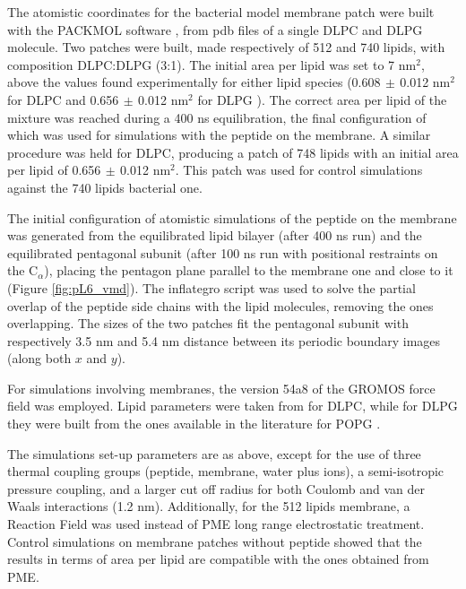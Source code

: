 The atomistic coordinates for the bacterial model membrane patch were built with the PACKMOL software \cite{Martinez2009}, from pdb files of a single DLPC \cite{PogerOrig} and DLPG \cite{Kukol2009} molecule. Two patches were built, made respectively of 512 and 740 lipids, with composition DLPC:DLPG (3:1). The initial area per lipid was set to 7 nm$^2$, above the values found experimentally for either lipid species (0.608$\,\pm\,$0.012 nm$^2$ for DLPC \cite{Kucerka2011} and 0.656$\,\pm\,$0.012 nm$^2$ for DLPG \cite{Pan2012}). The correct area per lipid of the mixture was reached during a 400 ns equilibration, the final configuration of which was used for simulations with the peptide on the membrane.
A similar procedure was held for DLPC, producing a patch of 748 lipids with an initial area per lipid of 0.656$\,\pm\,$0.012 nm$^2$. This patch was used for control simulations against the 740 lipids bacterial one.

The initial configuration of atomistic simulations of the peptide on the membrane was generated from the equilibrated lipid bilayer (after 400 ns run) and the equilibrated pentagonal subunit (after 100 ns run with positional restraints on the C$_\alpha$), placing the pentagon plane parallel to the membrane one and close to it (Figure \ref{fig:pL6_vmd}).
%
The inflategro \cite{Kandt2007} script was used to solve the partial overlap of the peptide side chains with the lipid molecules, removing the ones overlapping.
%
The sizes of the two patches fit the pentagonal subunit with respectively 3.5 nm and 5.4 nm distance between its periodic boundary images (along both $x$ and $y$).

For simulations involving membranes, the version 54a8 \cite{Oostenbrink2005, Reif2013} of the GROMOS force field was employed. Lipid parameters were taken from \cite{PogerOrig} for DLPC, while for DLPG they were built from the ones available in the literature for POPG \cite{Kukol2009}.

The simulations set-up parameters are as above, except for the use of three thermal coupling groups (peptide, membrane, water plus ions), a semi-isotropic pressure coupling, and a larger cut off radius for both Coulomb and van der Waals interactions (1.2 nm). Additionally, for the 512 lipids membrane, a Reaction Field \cite{Tironi1995} was used instead of PME long range electrostatic treatment. Control simulations on membrane patches without peptide showed that the results in terms of area per lipid are compatible with the ones obtained from PME.

